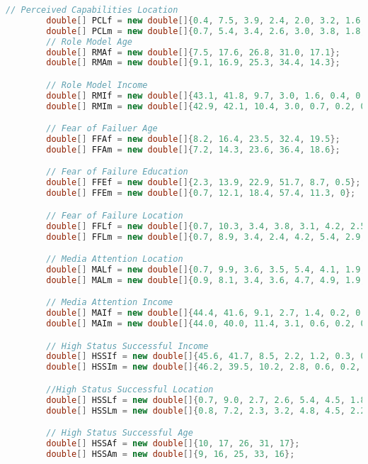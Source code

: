 \begin{lstlisting}[language=Java, caption=Entrepreneurs.java]
        // Perceived Capabilities Location
        double[] PCLf = new double[]{0.4, 7.5, 3.9, 2.4, 2.0, 3.2, 1.6, 41.1, 10.8, 6.9, 9.0, 3.7, 1.2, 1.0, 0.8, 4.4}; 
        double[] PCLm = new double[]{0.7, 5.4, 3.4, 2.6, 3.0, 3.8, 1.8, 41.1, 11.5, 7.2, 8.7, 3.5, 1.2, 0.9, 0.7, 4.3}; 
        // Role Model Age
        double[] RMAf = new double[]{7.5, 17.6, 26.8, 31.0, 17.1};    
        double[] RMAm = new double[]{9.1, 16.9, 25.3, 34.4, 14.3};   

        // Role Model Income
        double[] RMIf = new double[]{43.1, 41.8, 9.7, 3.0, 1.6, 0.4, 0.1, 0.4}; 
        double[] RMIm = new double[]{42.9, 42.1, 10.4, 3.0, 0.7, 0.2, 0.5, 0.2};

        // Fear of Failuer Age
        double[] FFAf = new double[]{8.2, 16.4, 23.5, 32.4, 19.5};
        double[] FFAm = new double[]{7.2, 14.3, 23.6, 36.4, 18.6};

        // Fear of Failure Education
        double[] FFEf = new double[]{2.3, 13.9, 22.9, 51.7, 8.7, 0.5};
        double[] FFEm = new double[]{0.7, 12.1, 18.4, 57.4, 11.3, 0};

        // Fear of Failure Location
        double[] FFLf = new double[]{0.7, 10.3, 3.4, 3.8, 3.1, 4.2, 2.5, 36.9, 2.6, 7.8, 12.1, 4.6, 1.9, 1.0, 0.4, 4.8};
        double[] FFLm = new double[]{0.7, 8.9, 3.4, 2.4, 4.2, 5.4, 2.9, 35.4, 1.8, 7.1, 13.2, 4.7, 2.2, 1.0, 0.5, 6.1};

        // Media Attention Location
        double[] MALf = new double[]{0.7, 9.9, 3.6, 3.5, 5.4, 4.1, 1.9, 41.1, 6.3, 9.1, 4.7, 2.9, 1.1, 1.0, 0.7, 4.0};
        double[] MALm = new double[]{0.9, 8.1, 3.4, 3.6, 4.7, 4.9, 1.9, 41.8, 6.5, 8.2, 5.8, 2.9, 1.3, 1.1, 0.7, 4.1};

        // Media Attention Income
        double[] MAIf = new double[]{44.4, 41.6, 9.1, 2.7, 1.4, 0.2, 0.2, 0.4};
        double[] MAIm = new double[]{44.0, 40.0, 11.4, 3.1, 0.6, 0.2, 0.4, 0.2};

        // High Status Successful Income
        double[] HSSIf = new double[]{45.6, 41.7, 8.5, 2.2, 1.2, 0.3, 0.1, 0.3};
        double[] HSSIm = new double[]{46.2, 39.5, 10.2, 2.8, 0.6, 0.2, 0.4, 0.2};

        //High Status Successful Location
        double[] HSSLf = new double[]{0.7, 9.0, 2.7, 2.6, 5.4, 4.5, 1.8, 35.0, 9.8, 8.3, 10.8, 2.8, 1.5, 1.0, 0.8, 3.4};
        double[] HSSLm = new double[]{0.8, 7.2, 2.3, 3.2, 4.8, 4.5, 2.2, 37.0, 10.2, 7.6, 10.7, 2.9, 1.6, 1.1, 0.8, 3.1};

        // High Status Successful Age
        double[] HSSAf = new double[]{10, 17, 26, 31, 17};
        double[] HSSAm = new double[]{9, 16, 25, 33, 16};


\end{lstlisting}
